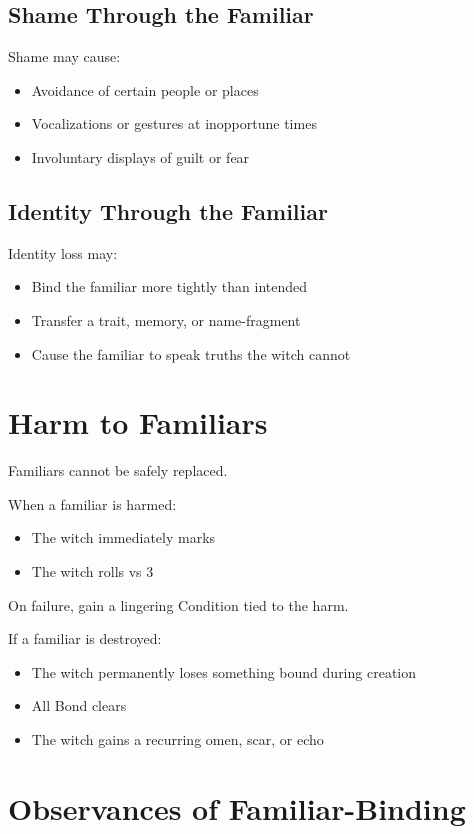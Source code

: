 \subsection{Shame Through the Familiar}
Shame may cause:
\begin{itemize}
  \item Avoidance of certain people or places
  \item Vocalizations or gestures at inopportune times
  \item Involuntary displays of guilt or fear
\end{itemize}

\subsection{Identity Through the Familiar}
Identity loss may:
\begin{itemize}
  \item Bind the familiar more tightly than intended
  \item Transfer a trait, memory, or name-fragment
  \item Cause the familiar to speak truths the witch cannot
\end{itemize}

\section{Harm to Familiars}
Familiars cannot be safely replaced.

When a familiar is harmed:
\begin{itemize}
  \item The witch immediately marks 
  \item The witch rolls  vs \DV{} 3
\end{itemize}

On failure, gain a lingering Condition tied to the harm.

If a familiar is destroyed:
\begin{itemize}
  \item The witch permanently loses something bound during creation
  \item All Bond clears
  \item The witch gains a recurring omen, scar, or echo
\end{itemize}

\section{Observances of Familiar-Binding}

